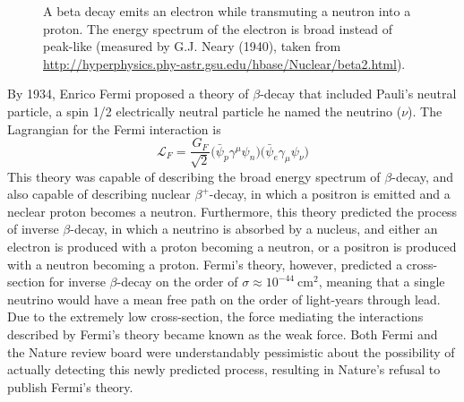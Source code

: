 \documentclass[/main.tex]{subfiles}
\begin{document}
\begin{figure}[t]
  \centering
  \caption[Beta decay and energy spectrum]{\label{fig:beta}
    A beta decay emits an electron while transmuting a neutron into a proton. The energy spectrum of the electron is broad instead of peak-like (measured by G.J. Neary (1940), taken from \url{http://hyperphysics.phy-astr.gsu.edu/hbase/Nuclear/beta2.html}).
  }
\end{figure}
By 1934, Enrico Fermi proposed a theory of $\beta$-decay that included Pauli's neutral particle, a spin 1/2 electrically neutral particle he named the neutrino ($\nu$)\cite{Fermi1934}.
The Lagrangian for the Fermi interaction is
\begin{equation}
  \mathcal{L}_F=\frac{G_F}{\sqrt{2}}\big(\bar \psi_p \gamma^\mu \psi_n\big)\big(\bar \psi_e \gamma_\mu \psi_\nu\big)
\end{equation}
This theory was capable of describing the broad energy spectrum of $\beta$-decay, and also capable of describing nuclear $\beta^+$-decay, in which a positron is emitted and a neclear proton becomes a neutron.
Furthermore, this theory predicted the process of inverse $\beta$-decay, in which a neutrino is absorbed by a nucleus, and either an electron is produced with a proton becoming a neutron, or a positron is produced with a neutron becoming a proton.
Fermi's theory, however, predicted a cross-section for inverse $\beta$-decay on the order of $\sigma\approx10^{-44}~\mathrm{cm}^2$, meaning that a single neutrino would have a mean free path on the order of light-years through lead.
Due to the extremely low cross-section, the force mediating the interactions described by Fermi's theory became known as the weak force.
Both Fermi and the Nature review board were understandably pessimistic about the possibility of actually detecting this newly predicted process, resulting in Nature's refusal to publish Fermi's theory.
\end{document}
